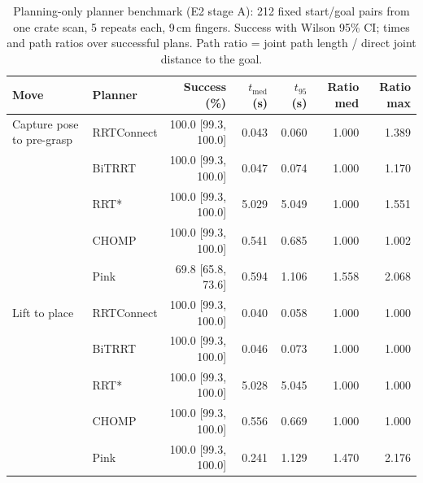\begin{table}[htbp]
\centering
\caption{Planning-only planner benchmark (E2 stage A): 212 fixed start/goal pairs from one crate scan, 5 repeats each, 9\,cm fingers. Success with Wilson 95\% CI; times and path ratios over successful plans. Path ratio = joint path length / direct joint distance to the goal.}
\label{tab:e2_planner_benchmark}
\begin{tabular}{llrrrrr}
\toprule
Move & Planner & Success (\%) & $t_\mathrm{med}$ (s) & $t_{95}$ (s) & Ratio med & Ratio max \\
\midrule
Capture pose to pre-grasp & RRTConnect & 100.0 [99.3, 100.0] & 0.043 & 0.060 & 1.000 & 1.389 \\
 & BiTRRT & 100.0 [99.3, 100.0] & 0.047 & 0.074 & 1.000 & 1.170 \\
 & RRT* & 100.0 [99.3, 100.0] & 5.029 & 5.049 & 1.000 & 1.551 \\
 & CHOMP & 100.0 [99.3, 100.0] & 0.541 & 0.685 & 1.000 & 1.002 \\
 & Pink & 69.8 [65.8, 73.6] & 0.594 & 1.106 & 1.558 & 2.068 \\
\midrule
Lift to place & RRTConnect & 100.0 [99.3, 100.0] & 0.040 & 0.058 & 1.000 & 1.000 \\
 & BiTRRT & 100.0 [99.3, 100.0] & 0.046 & 0.073 & 1.000 & 1.000 \\
 & RRT* & 100.0 [99.3, 100.0] & 5.028 & 5.045 & 1.000 & 1.000 \\
 & CHOMP & 100.0 [99.3, 100.0] & 0.556 & 0.669 & 1.000 & 1.000 \\
 & Pink & 100.0 [99.3, 100.0] & 0.241 & 1.129 & 1.470 & 2.176 \\
\bottomrule
\end{tabular}
\end{table}
